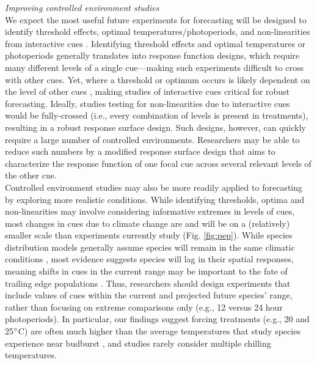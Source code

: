 \documentclass[11pt,letter]{article}
\newcommand{\R}[1]{\label{#1}\linelabel{#1}}
\begin{document}
\emph{Improving controlled environment studies}\\
We expect the most useful future experiments for forecasting will be designed to identify threshold effects, optimal temperatures/photoperiods, and non-linearities from interactive cues \citep{Caffarra:2011qf}. Identifying threshold effects and optimal temperatures or photoperiods generally translates into \R{r2respfx}response function designs, which require many different levels of a single cue---making such experiments difficult to cross with other cues. Yet, where a threshold or optimum occurs is likely dependent on the level of other cues \citep{stearns1958,flynn2018}, making studies of interactive cues critical for robust forecasting. Ideally, studies testing for non-linearities due to interactive cues would be fully-crossed (i.e., every combination of levels is present in treatments), \R{r2studydesignstart}resulting in a robust response surface design. Such designs, however, can quickly require a large number of controlled environments. Researchers may be able to reduce such numbers by a modified response surface design that aims to characterize the response function of one focal cue across several relevant levels of the other cue.\R{r2studydesignend} \\ %

Controlled environment studies may also be more readily applied to forecasting by exploring more realistic conditions. While identifying thresholds, optima and non-linearities may involve considering informative extremes in levels of cues, most changes in cues due to climate change are and will be on a (relatively) smaller scale than experiments currently study (Fig. \ref{fig:pep}). While species distribution models generally assume species will remain in the same climatic conditions \citep{elith2009species}, most evidence suggests species will lag in their spatial responses, meaning shifts in cues in the current range may be important to the fate of trailing edge populations \citep{bertrand2011changes,lenoir2015climate}. Thus, researchers should design experiments that include values of cues within the current and projected future species' range, rather than focusing on extreme comparisons only (e.g., 12 versus 24 hour photoperiods). In particular, our findings suggest forcing treatments (e.g., 20 and 25$\degree$C) are often much higher than the average temperatures that study species experience near budburst \citep{fu2015,gusewell2017}, and studies rarely consider multiple chilling temperatures. \\ %
\end{document}

